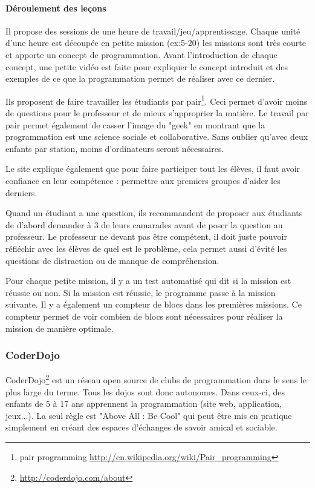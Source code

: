 \paragraph{Déroulement des leçons}
Il propose des sessions de une heure de travail/jeu/apprentissage. Chaque unité d'une heure est découpée en petite mission (ex:5-20) les missions sont très courte et apporte un concept de programmation. Avant l'introduction de chaque concept, une petite vidéo est faite pour expliquer le concept introduit et des exemples de ce que la programmation permet de réaliser avec ce dernier.

Ils proposent de faire travailler les étudiants par pair\footnote{pair programming \url{http://en.wikipedia.org/wiki/Pair\_programming}}. Ceci permet d'avoir moins de questions pour le professeur et de mieux s'approprier la matière. Le travail par pair permet également de casser l'image du "geek" en montrant que la programmation est une science sociale et collaborative. Sans oublier qu'avec deux enfants par station, moins d'ordinateurs seront nécessaires.

Le site explique également que pour faire participer tout les élèves, il faut avoir confiance en leur compétence : permettre aux premiers groupes d'aider les derniers.

Quand un étudiant a une question, ils recommandent de proposer aux étudiants de d'abord demander à 3 de leurs camarades avant de poser la question au professeur. Le professeur ne devant pas être compétent, il doit juste pouvoir réfléchir avec les élèves de quel est le problème, cela permet aussi d'évité les questions de distraction ou de manque de compréhension.

Pour chaque petite mission, il y a un test automatisé qui dit si la mission est réussie ou non. Si la mission est réussie, le programme passe à la mission suivante. Il y a également un compteur de blocs dans les premières missions. Ce compteur permet de voir combien de blocs sont nécessaires pour réaliser la mission de manière optimale.

\subsubsection{CoderDojo}
CoderDojo\footnote{\url{http://coderdojo.com/about}} est un réseau open source de clubs de programmation dans le sens le plus large du terme. Tous les dojos sont donc autonomes. Dans ceux-ci, des enfants de 5 à 17 ans apprennent la programmation (site web, application, jeux...). La seul règle est "Above All : Be Cool" qui peut être mis en pratique simplement en créant des espaces d'échanges de savoir amical et sociable.

